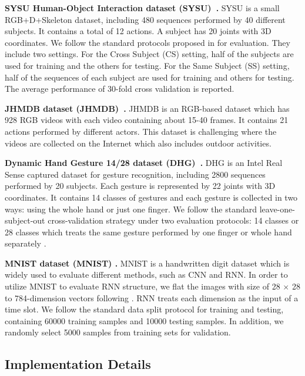 \documentclass[journal]{IEEEtran}
\begin{document}
\textbf{SYSU Human-Object Interaction dataset (SYSU)~\cite{hu2015jointly}.} SYSU is a small RGB+D+Skeleton dataset, including 480 sequences performed by 40 different subjects. It contains a total of 12 actions. A subject has 20 joints with 3D coordinates. We follow the standard protocols proposed in \cite{hu2015jointly} for evaluation. They include two settings. For the Cross Subject (CS) setting, half of the subjects are used for training and the others for testing. For the Same Subject (SS) setting, half of the sequences of each subject are used for training and others for testing. The average performance of 30-fold cross validation is reported.

\textbf{JHMDB dataset (JHMDB)~\cite{jhuang2013towards}.} JHMDB is an RGB-based dataset which has 928 RGB videos with each video containing about 15-40 frames. It contains 21 actions performed by different actors. This dataset is challenging where the videos are collected on the Internet which also includes outdoor activities.

\textbf{Dynamic Hand Gesture 14/28 dataset (DHG)~\cite{de2016skeleton}.} DHG is an Intel Real Sense captured dataset for gesture recognition, including 2800 sequences performed by 20 subjects. Each gesture is represented by 22 joints with 3D coordinates. It contains 14 classes of gestures and each gesture is collected in two ways: using the whole hand or just one finger. We follow the standard leave-one-subject-out cross-validation strategy under two evaluation protocols: 14 classes or 28 classes which treats the same gesture performed by one finger or whole hand separately \cite{de2016skeleton}.

\textbf{MNIST dataset (MNIST) \cite{lecun1998gradient}.} MNIST is a handwritten digit dataset which is widely used to evaluate different methods, such as CNN and RNN. In order to utilize MNIST to evaluate RNN structure, we flat the images with size of 28 $\times$ 28 to 784-dimension vectors following \cite{le2015simple,arjovsky2016unitary,cooijmans2016recurrent,campos2018skip,li2018independently}. RNN treats each dimension as the input of a time slot. We follow the standard data split protocol for training and testing, containing 60000 training samples and 10000 testing samples. In addition, we randomly select 5000 samples from training sets for validation.


\subsection{Implementation Details}
\label{subsec:implement}
\end{document}
